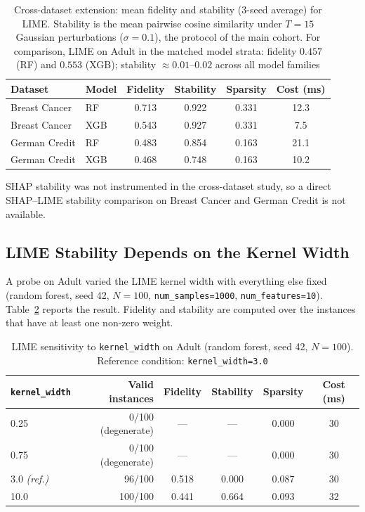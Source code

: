 \documentclass{cleiej}
\begin{document}
\begin{table}[htb]
\centering
\caption{Cross-dataset extension: mean fidelity and stability (3-seed
average) for LIME. Stability is the mean pairwise cosine similarity under
$T=15$ Gaussian perturbations ($\sigma=0.1$), the protocol of the main
cohort. For comparison, LIME on Adult in the matched model strata: fidelity
$0.457$ (RF) and $0.553$ (XGB); stability $\approx 0.01$--$0.02$ across all
model families}
\label{tab:exp3_lime}
\begin{tabular}{llcccc}
\toprule
Dataset        & Model & Fidelity & Stability & Sparsity & Cost (ms) \\
\midrule
Breast Cancer  & RF    & 0.713    & 0.922     & 0.331    & 12.3 \\
Breast Cancer  & XGB   & 0.543    & 0.927     & 0.331    & 7.5  \\
German Credit  & RF    & 0.483    & 0.854     & 0.163    & 21.1 \\
German Credit  & XGB   & 0.468    & 0.748     & 0.163    & 10.2 \\
\bottomrule
\end{tabular}
\end{table}

SHAP stability was not instrumented in the cross-dataset study, so a direct
SHAP--LIME stability comparison on Breast Cancer and German Credit is not
available.

\subsection{LIME Stability Depends on the Kernel Width}
\label{sec:kernel}

A probe on Adult varied the LIME kernel width with everything else fixed
(random forest, seed 42, $N=100$, \texttt{num\_samples=1000},
\texttt{num\_features=10}). Table~\ref{tab:kw} reports the result. Fidelity
and stability are computed over the instances that have at least one
non-zero weight.

\begin{table}[htb]
\centering
\caption{LIME sensitivity to \texttt{kernel\_width} on Adult (random
forest, seed 42, $N=100$). Reference condition: \texttt{kernel\_width=3.0}}
\label{tab:kw}
\begin{tabular}{lrcccc}
\toprule
\texttt{kernel\_width} & Valid instances & Fidelity & Stability & Sparsity & Cost (ms) \\
\midrule
0.25  & 0/100 (degenerate) & ---   & ---   & 0.000 & 30 \\
0.75  & 0/100 (degenerate) & ---   & ---   & 0.000 & 30 \\
3.0 \emph{(ref.)} & 96/100 & 0.518 & 0.000 & 0.087 & 30 \\
10.0  & 100/100            & 0.441 & 0.664 & 0.093 & 32 \\
\bottomrule
\end{tabular}
\end{table}
\end{document}
